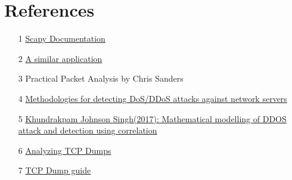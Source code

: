 \chapter{References}
{
	\begin{enumerate}
		\item[1] \href{https://scapy.net}{Scapy Documentation}
		\item[2] \href{https://apackets.com}{A similar application}
		\item[3] {Practical Packet Analysis by Chris Sanders}
		\item[4] \href{http://www.thinkmind.org/articles/icsnc_2012_4_50_20134.pdf}{Methodologies for detecting DoS/DDoS attacks against network servers}
		\item[5] \href{https://tandfonline.com/doi/full/10.1080/23742917.2017.1384213}{Khundrakpam Johnson Singh(2017): Mathematical modelling of DDOS attack and detection using correlation}
		\item[6] \href{https://medium.com/@eranda/analyze-tcp-dumps-a089c2644f19}{Analyzing TCP Dumps}
		\item[7] \href{https://geekflare.com/tcpdump-examples/}{TCP Dump guide}
	\end{enumerate}
}